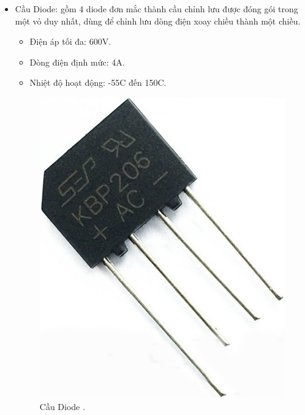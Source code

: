 \documentclass[a4paper,12pt,oneside]{article}
\begin{document}
\begin{enumerate}
\begin{itemize}
\item	Cầu Diode: gồm 4 diode đơn mắc thành cầu chỉnh lưu được đóng gói trong một vỏ duy nhất, dùng để chỉnh lưu dòng điện xoay chiều thành một chiều.
	\begin{itemize}
	\item	Điện áp tối đa: 600V.
	\item	Dòng điện định mức: 4A.
	\item	Nhiệt độ hoạt động: -55\textdegree{}C đến 150\textdegree{}C.
	\end{itemize}
\begin{figure}[H]
\centering
\includegraphics[scale=.3]{hinh/PPM/ppm_caudiode.jpg}
\caption{Cầu Diode \cite{dientuachau}.}
\end{figure}
\end{itemize}
\end{enumerate}
\end{document}

